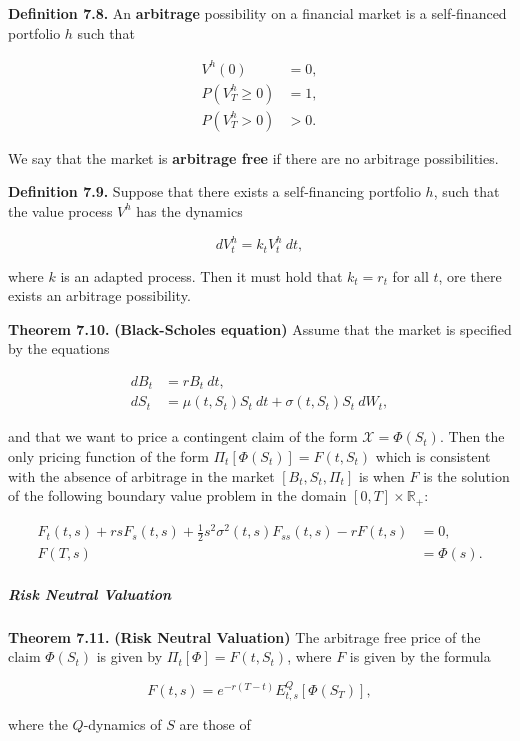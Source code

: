 \documentclass[
]{article}
\begin{document}
\textbf{Definition 7.8.} An \textbf{arbitrage} possibility on a
financial market is a self-financed portfolio \(h\) such that

\begin{align*}
V^h(0)&=0,\\
P(V_T^h\ge0)&=1,\\
P(V_T^h>0)&>0.
\end{align*}

We say that the market is \textbf{arbitrage free} if there are no
arbitrage possibilities.

\textbf{Definition 7.9.} Suppose that there exists a self-financing
portfolio \(h\), such that the value process \(V^h\) has the dynamics

\[
d V_t^h=k_tV_t^h\ dt,
\]

where \(k\) is an adapted process. Then it must hold that \(k_t=r_t\)
for all \(t\), ore there exists an arbitrage possibility.

\textbf{Theorem 7.10.} \textbf{(Black-Scholes equation)} Assume that the
market is specified by the equations

\begin{align*}
dB_t&=rB_t\ dt,\\
dS_t&=\mu(t,S_t) S_t\ dt+\sigma(t,S_t)S_t\ dW_t,
\end{align*}

and that we want to price a contingent claim of the form
\(\mathcal{X}=\Phi(S_t)\). Then the only pricing function of the form
\(\Pi_t[\Phi(S_t)]=F(t,S_t)\) which is consistent with the absence of
arbitrage in the market \([B_t,S_t,\Pi_t]\) is when \(F\) is the
solution of the following boundary value problem in the domain
\([0,T]\times\mathbb{R}_+\):

\begin{align*}
F_t(t,s)+rsF_s(t,s)+\frac{1}{2}s^2\sigma^2(t,s)F_{ss}(t,s)-rF(t,s)&=0,\\
F(T,s)&=\Phi(s).
\end{align*}

\hypertarget{risk-neutral-valuation-1}{%
\subparagraph{Risk Neutral Valuation}\label{risk-neutral-valuation-1}}

\textbf{Theorem 7.11.} \textbf{(Risk Neutral Valuation)} The arbitrage
free price of the claim \(\Phi(S_t)\) is given by
\(\Pi_t[\Phi]=F(t,S_t)\), where \(F\) is given by the formula

\[
F(t,s)=e^{-r(T-t)}E^Q_{t,s}[\Phi(S_T)],
\]

where the \(Q\)-dynamics of \(S\) are those of
\end{document}
